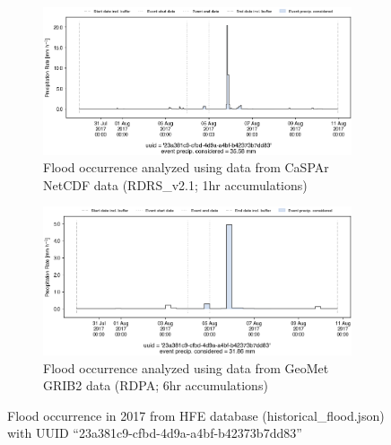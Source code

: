 \documentclass[10pt,a4paper,titlepage,parskip]{scrartcl}
\begin{document}
\begin{figure}[h]
	\begin{subfigure}[a]{1.0\textwidth}
		\centering
		\includegraphics[width=\linewidth]{figures/compare_Geomet_CaSPAr/interpolated_at_stations_occurrence_1756_identified-timesteps_RDRS_v2.1.png}
		\caption{Flood occurrence analyzed using data from CaSPAr NetCDF data (RDRS\_v2.1; 1hr accumulations)}
	\end{subfigure}
	\par\bigskip\bigskip
	\begin{subfigure}[b]{1.0\textwidth}
		\centering
		\includegraphics[width=\linewidth]{figures/compare_Geomet_CaSPAr/interpolated_at_stations_occurrence_1756_identified-timesteps_rdpa_10km_6f.png}
		\caption{Flood occurrence analyzed using data from GeoMet GRIB2 data (RDPA; 6hr accumulations)}
	\end{subfigure}
	\par\bigskip\bigskip
	\caption{Flood occurrence in 2017 from HFE database (historical\_flood.json) with UUID ``23a381c9-cfbd-4d9a-a4bf-b42373b7dd83''}
\end{figure}
\pagebreak
\end{document}
